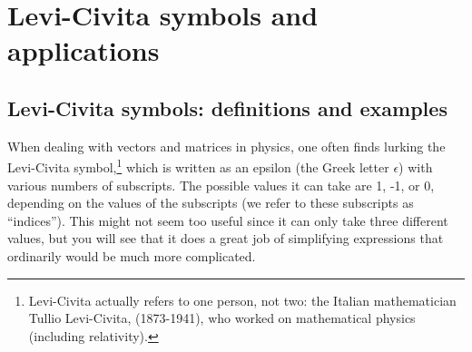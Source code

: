 

\section{Levi-Civita symbols and applications}\label{sec:LeviCivita}
\subsection{Levi-Civita symbols: definitions and examples}\label{subsec:LeviCivita}
When dealing with vectors and matrices in physics, one often finds lurking  the Levi-Civita symbol,\footnote{Levi-Civita actually refers to one person, not two: the Italian mathematician Tullio Levi-Civita, (1873-1941), who worked on mathematical physics (including relativity).} which is written as an epsilon (the Greek letter $\epsilon$) with various numbers of subscripts.  The possible values it can take are 1, -1, or 0, depending on the values of the subscripts (we refer to these subscripts as ``indices'').  This might not seem too useful since it can only take three different values, but you will see that it does a great job of simplifying expressions that ordinarily would be much more complicated.  

